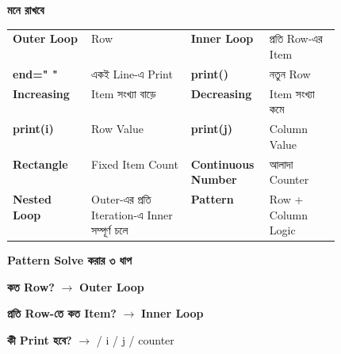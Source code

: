 \begin{rememberbox}

\textbf{\color{deepOrange}মনে রাখবে}

\begin{tabularx}
{\linewidth}
{
>{\bfseries\RaggedRight\arraybackslash}p{0.24\linewidth}
Y
>{\bfseries\RaggedRight\arraybackslash}p{0.24\linewidth}
Y
}

Outer Loop
&
Row
&
Inner Loop
&
প্রতি Row-এর Item
\\[0.5mm]

\textenglish{\ttfamily end=" "}
&
একই Line-এ Print
&
\textenglish{\ttfamily print()}
&
নতুন Row
\\[0.5mm]

Increasing
&
Item সংখ্যা বাড়ে
&
Decreasing
&
Item সংখ্যা কমে
\\[0.5mm]

\textenglish{\ttfamily print(i)}
&
Row Value
&
\textenglish{\ttfamily print(j)}
&
Column Value
\\[0.5mm]

Rectangle
&
Fixed Item Count
&
Continuous Number
&
আলাদা Counter
\\[0.5mm]

Nested Loop
&
Outer-এর প্রতি Iteration-এ Inner সম্পূর্ণ চলে
&
Pattern
&
Row + Column Logic
\\

\end{tabularx}

\medskip

\begin{center}

\textbf{Pattern Solve করার ৩ ধাপ}

\medskip

\textbf{কত Row?}
\(\longrightarrow\)
\textbf{Outer Loop}

\qquad

\textbf{প্রতি Row-তে কত Item?}
\(\longrightarrow\)
\textbf{Inner Loop}

\medskip

\textbf{কী Print হবে?}
\(\longrightarrow\)
\textenglish{\ttfamily * / i / j / counter}

\end{center}

\end{rememberbox}

\small



